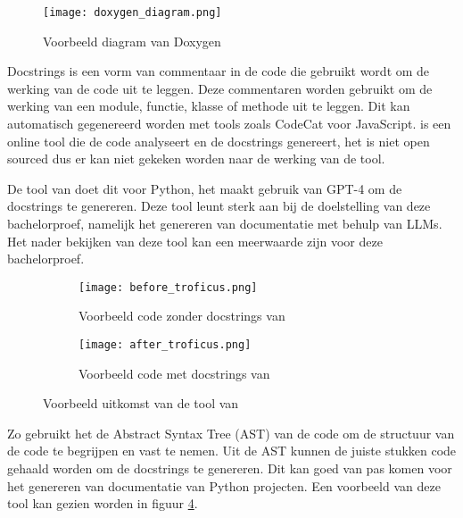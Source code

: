 \begin{figure}[h]
  \centering
  \texttt{[image: doxygen\_diagram.png]}
  \caption{Voorbeeld diagram van Doxygen \autocite{Doxygen2023}}
  \label{fig:Doxygen-diagram}
\end{figure}

Docstrings is een vorm van commentaar in de code die gebruikt wordt om de werking van de code uit te leggen.
Deze commentaren worden gebruikt om de werking van een module, functie, klasse of methode uit te leggen.
Dit kan automatisch gegenereerd worden met tools zoals CodeCat \autocite{CodeCat2024} voor JavaScript.
\textcite{CodeCat2024} is een online tool die de code analyseert en de docstrings genereert, het is niet open sourced dus er kan niet gekeken worden naar de werking van de tool.

De tool van \textcite{Trofficus2023} doet dit voor Python, het maakt gebruik van GPT-4 \autocite{OpenAI2023} om de docstrings te genereren.
Deze tool leunt sterk aan bij de doelstelling van deze bachelorproef, namelijk het genereren van documentatie met behulp van LLMs.
Het nader bekijken van deze tool kan een meerwaarde zijn voor deze bachelorproef.

\begin{figure}
  \centering
  \begin{subfigure}[b]{0.5\textwidth}
      \centering
      \texttt{[image: before\_troficus.png]}
      \caption{Voorbeeld code zonder docstrings van \textcite{Trofficus2023}}
      \label{fig:before-Trofficus}
  \end{subfigure}
  \hfill
  \begin{subfigure}[b]{0.5\textwidth}
      \centering
      \texttt{[image: after\_troficus.png]}
      \caption{Voorbeeld code met docstrings van \textcite{Trofficus2023}}
      \label{fig:after-Trofficus}
  \end{subfigure}
     \caption{Voorbeeld uitkomst van de tool van \textcite{Trofficus2023}}
     \label{fig:Before-After-Trofficus}
\end{figure}

Zo gebruikt het de Abstract Syntax Tree (AST) van de code om de structuur van de code te begrijpen en vast te nemen.
Uit de AST kunnen de juiste stukken code gehaald worden om de docstrings te genereren.
Dit kan goed van pas komen voor het genereren van documentatie van Python projecten.
Een voorbeeld van deze tool kan gezien worden in figuur \ref{fig:Before-After-Trofficus}. 

